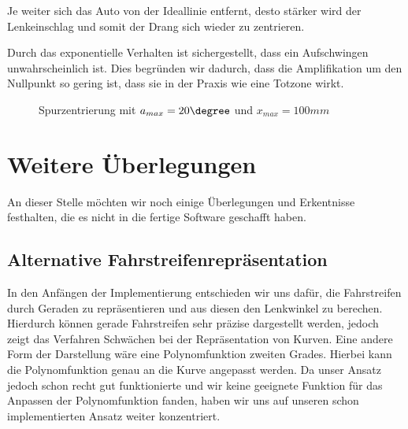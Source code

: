 \documentclass[a4paper,12pt]{report}
\begin{document}
	Je weiter sich das Auto von der Ideallinie entfernt, desto stärker wird der Lenkeinschlag und somit der Drang sich wieder zu zentrieren.
	
	Durch das exponentielle Verhalten ist sichergestellt, dass ein Aufschwingen unwahrscheinlich ist. Dies begründen wir dadurch, dass die Amplifikation um den Nullpunkt so gering ist, dass sie in der Praxis wie eine Totzone wirkt.
	
	\begin{figure}[ht]
		\centering
		
		
		\caption{Spurzentrierung mit $a_{max} = 20\degree$ und $x_{max} = 100mm$}
		\label{img-spurzentrierung-function}
	\end{figure}
	
\section{Weitere Überlegungen}
	An dieser Stelle möchten wir noch einige Überlegungen und Erkentnisse festhalten, 
	die es nicht in die fertige Software geschafft haben. 	
	
\subsection{Alternative Fahrstreifenrepräsentation}
	In den Anfängen der Implementierung entschieden wir uns dafür, die Fahrstreifen durch Geraden zu repräsentieren und aus diesen den Lenkwinkel zu berechen. Hierdurch können gerade Fahrstreifen sehr präzise dargestellt werden, jedoch zeigt das Verfahren Schwächen bei der Repräsentation von Kurven. Eine andere Form der Darstellung wäre eine Polynomfunktion zweiten Grades. Hierbei kann die Polynomfunktion genau an die Kurve angepasst werden. Da unser Ansatz jedoch schon recht gut funktionierte und wir keine geeignete Funktion für das Anpassen der Polynomfunktion fanden, haben wir uns auf unseren schon implementierten Ansatz weiter konzentriert. 
	
	
\end{document}
